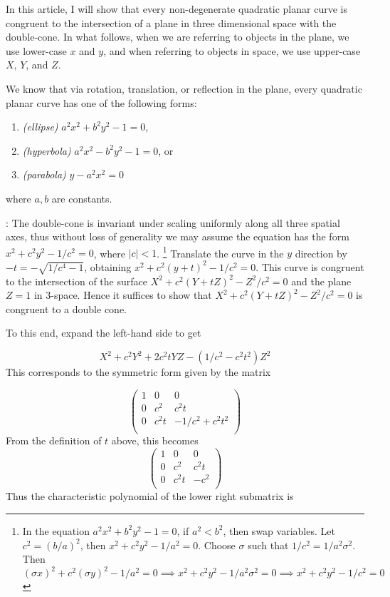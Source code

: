 \documentclass[12pt]{article}
\begin{document}
In this article, I will show that every non-degenerate quadratic
planar curve is congruent to the intersection of a plane in three
dimensional space with the double-cone.  In what follows, when we are
referring to objects in the plane, we use lower-case $x$ and $y$, and
when referring to objects in space, we use upper-case $X$, $Y$, and
$Z$.

We know that via rotation, translation, or reflection in the plane, every
quadratic planar curve has one of the following forms:

\begin{enumerate}
\item {\it (ellipse)} $a^2x^2 + b^2y^2 - 1 = 0$,
\item {\it (hyperbola)} $a^2x^2 - b^2y^2 - 1 = 0$, or
\item {\it (parabola)} $y - a^2x^2 = 0$
\end{enumerate}
where $a,b$ are constants.

\medskip

: The double-cone is invariant under scaling uniformly along all three spatial axes, thus without loss of generality we may assume the
equation has the form $x^2 + c^2 y^2 - 1/c^2 = 0$, where $|c| < 1$. \footnote{
In the equation $a^2x^2 + b^2y^2 - 1 = 0$, if $a^2 < b^2$, then swap
variables.  Let $c^2 = (b/a)^2$, then $x^2 + c^2 y^2 - 1/a^2 = 0$.
Choose $\sigma$ such that $1/c^2 = 1/a^2\sigma^2$.  Then
$(\sigma x)^2
+ c^2 (\sigma y)^2 - 1/a^2 = 0 \implies x^2  + c^2 y^2 - 1/a^2\sigma^2
= 0 \implies x^2 + c^2 y^2 - 1/c^2 = 0$
}
Translate the curve in the $y$ direction by $-t = -\sqrt{1/c^4 - 1}$,
obtaining $x^2 + c^2 (y + t)^2 - 1/c^2 = 0$.  This curve is congruent to
the intersection of the surface $X^2 + c^2 (Y + tZ)^2 - Z^2/c^2 = 0$ and
the plane $Z = 1$ in 3-space.  Hence it suffices to show that $ X^2 +
c^2 (Y + tZ)^2 - Z^2/c^2 = 0$ is congruent to a double cone.

To this end, expand the left-hand side to get

$$X^2 + c^2 Y^2 + 2c^2t YZ - (1/c^2 - c^2t^2)Z^2$$
This corresponds to the symmetric form given by the matrix 

\begin{equation}\label{form}\left(
\begin{matrix} 
1 & 0 & 0 \\
0 & c^2 & c^2t \\
0 & c^2 t& -1/c^2 + c^2t^2\\
\end{matrix}
\right)
\end{equation} 
From the definition of $t$ above, this becomes
$$\left(
\begin{matrix}
1 & 0 & 0 \\
0 & c^2 & c^2 t\\
0 & c^2 t& -c^2\\
\end{matrix}
\right)$$
Thus the characteristic polynomial of the lower right submatrix is
\end{document}
